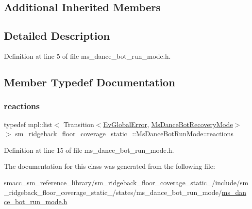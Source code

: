 \subsection*{Additional Inherited Members}


\subsection{Detailed Description}


Definition at line 5 of file ms\+\_\+dance\+\_\+bot\+\_\+run\+\_\+mode.\+h.



\subsection{Member Typedef Documentation}
\mbox{\label{classsm__ridgeback__floor__coverage__static__1_1_1MsDanceBotRunMode_a135fc80d5d84c8cdca6eec833d3a7e2f}} 
\subsubsection{\texorpdfstring{reactions}{reactions}}
{\footnotesize\ttfamily typedef mpl\+::list$<$ Transition$<$\hyperlink{structsm__ridgeback__floor__coverage__static__1_1_1EvGlobalError}{Ev\+Global\+Error}, \hyperlink{classsm__ridgeback__floor__coverage__static__1_1_1MsDanceBotRecoveryMode}{Ms\+Dance\+Bot\+Recovery\+Mode}$>$ $>$ \hyperlink{classsm__ridgeback__floor__coverage__static__1_1_1MsDanceBotRunMode_a135fc80d5d84c8cdca6eec833d3a7e2f}{sm\+\_\+ridgeback\+\_\+floor\+\_\+coverage\+\_\+static\+\_\+::\+Ms\+Dance\+Bot\+Run\+Mode\+::reactions}}



Definition at line 15 of file ms\+\_\+dance\+\_\+bot\+\_\+run\+\_\+mode.\+h.



The documentation for this class was generated from the following file\+:\begin{DoxyCompactItemize}
\item 
smacc\+\_\+sm\+\_\+reference\+\_\+library/sm\+\_\+ridgeback\+\_\+floor\+\_\+coverage\+\_\+static\+\_/include/sm\+\_\+ridgeback\+\_\+floor\+\_\+coverage\+\_\+static\+\_/states/ms\+\_\+dance\+\_\+bot\+\_\+run\+\_\+mode/\hyperlink{sm__ridgeback__floor__coverage__static__1_2include_2sm__ridgeback__floor__coverage__static__1_2sc3d2444071268a2bfb6f019dbda92890}{ms\+\_\+dance\+\_\+bot\+\_\+run\+\_\+mode.\+h}\end{DoxyCompactItemize}
